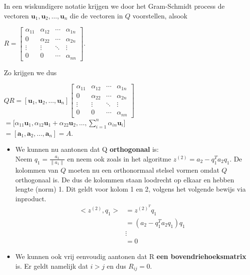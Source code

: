 \documentclass{article}
\begin{document}
In een wiskundigere notatie krijgen we door het Gram-Schmidt process de vectoren  $ {\mathbf u}_1, {\mathbf u}_2, \ldots, {\mathbf u}_n$ die de vectoren in $Q$ voorstellen, alsook
\begin{center}
$\displaystyle R = \begin{bmatrix}{\alpha}_{11} & {\alpha}_{12} & \cdots & {\alpha}_{1n}\\
0 & {\alpha}_{22} & \cdots & {\alpha}_{2n} \\
\vdots & \vdots & \ddots & \vdots \\
0 & 0 & \cdots & {\alpha}_{nn} \end{bmatrix}.$
\end{center}
Zo krijgen we dus
\begin{center}
	$ QR = [{\mathbf u}_1, {\mathbf u}_2, \ldots, {\mathbf u}_n] \begin{bmatrix}{\alpha}_{11} & {\alpha}_{12} & \cdots & {\alpha}_{1n}\\
0 & {\alpha}_{22} & \cdots & {\alpha}_{2n} \\
\vdots & \vdots & \ddots & \vdots \\
0 & 0 & \cdots & {\alpha}_{nn} \end{bmatrix}$\\
\vspace{5mm}
$ = \biggl[ {\alpha}_{11} {\mathbf u}_1 , {\alpha}_{12} {\mathbf u}_1 + {\alpha}_{22} {\mathbf u}_2 , \ldots , \sum\limits_{i=1}^n \alpha_{in}{\mathbf u}_i \biggr]$\\
\vspace{3mm}
$ = [{\mathbf a}_1, {\mathbf a}_2, \ldots, {\mathbf a}_n] = A$. 

\begin{itemize}
\item We kunnen nu aantonen dat Q \textbf{orthogonaal} is:\\
Neem $q_1 = \frac{a_1}{\parallel a_1 \parallel}$ en neem ook zoals in het algoritme $z^{(2)} = a_2 - q^T_1a_2q_1.$ De kolommen van $Q$ moeten nu een orthonormaal stelsel vormen omdat $Q$ orthogonaal is. De dus de kolommen staan loodrecht op elkaar en hebben lengte (norm) 1. Dit geldt voor kolom 1 en 2, volgens het volgende bewijs via inproduct.
\begin{align*}
< z^(2), q_1 > & = z^(2)^Tq_1\\
&= (a_2 - q^T_1a_2q_1)q_1\\
& \vdots\\
&= 0
\end{align*}
\item We kunnen ook vrij eenvoudig aantonen dat R \textbf{een bovendriehoeksmatrix} is. Er geldt namelijk dat $ i>j$ en dus $R_{ij} = 0$.
\end{itemize}

\end{center}
\end{document}
